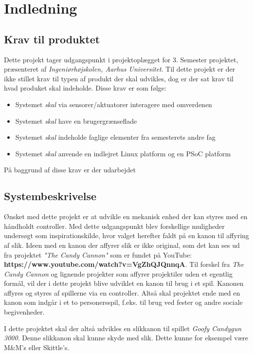 \chapter{Indledning}
\section{Krav til produktet}
Dette projekt tager udgangspunkt i projektoplægget for 3. Semester projektet, præsenteret af \textit{Ingeniørhøjskolen, Aarhus Universitet}. Til dette projekt er der ikke stillet krav til typen af produkt der skal udvikles, dog er der sat krav til hvad produket skal indeholde. Disse krav er som følge:

\begin{itemize}
	\item{Systemet \textit{skal} via sensorer/aktuatorer interagere med omverdenen}
	\item{Systemet \textit{skal} have en brugergrænseflade}
	\item{Systemet \textit{skal} indeholde faglige elementer fra semesterets andre fag}
	\item{Systemet \textit{skal} anvende en indlejret Linux platform og en PSoC platform}
\end{itemize}

På baggrund af disse krav er der udarbejdet 

\section{Systembeskrivelse}
Ønsket med dette projekt er at udvikle en mekanisk enhed der kan styres med en håndholdt controller. Med dette udgangspunkt blev forskellige muligheder undersøgt som inspirationskilde, hvor valget herefter faldt på en kanon til affyring af slik. Ideen med en kanon der affyrer slik er ikke original, som det kan ses ud fra projektet \textit{"The Candy Cannon"} som er fundet på YouTube: \textbf{https://www.youtube.com/watch?v=VgZhQJQnnqA}. Til forskel fra \textit{The Candy Cannon} og lignende projekter som affyrer projektiler uden et egentlig formål, vil der i dette projekt blive udviklet en kanon til brug i et spil. Kanonen affyres og styres af spillerne via en controller. Altså skal projektet ende med en kanon som indgår i et to personersspil, f.eks. til brug ved fester og andre sociale begivenheder.

I dette projektet skal der altså udvikles en slikkanon til spillet \textit{Goofy Candygun 3000}. Denne slikkanon skal kunne skyde med slik. Dette kunne for eksempel være M\&M’s eller Skittle’s.

